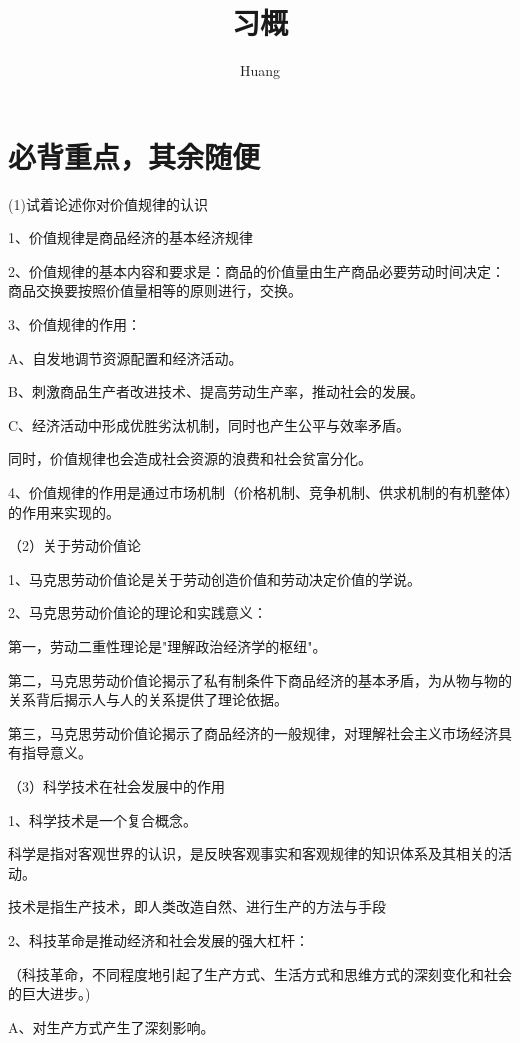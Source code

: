 \documentclass[lang=cn,10pt]{elegantbook}
\title{习概}
\author{ Huang}
\begin{document}
	
	\maketitle
	\frontmatter
	
	\tableofcontents
	
	\mainmatter
	\chapter{必背重点，其余随便}
	(1)试着论述你对价值规律的认识
	
	1、价值规律是商品经济的基本经济规律
	
	2、价值规律的基本内容和要求是：商品的价值量由生产商品必要劳动时间决定：商品交换要按照价值量相等的原则进行，交换。
	
	3、价值规律的作用：
	
	A、自发地调节资源配置和经济活动。
	
	B、刺激商品生产者改进技术、提高劳动生产率，推动社会的发展。
	
	C、经济活动中形成优胜劣汰机制，同时也产生公平与效率矛盾。
	
	同时，价值规律也会造成社会资源的浪费和社会贫富分化。
	
	4、价值规律的作用是通过市场机制（价格机制、竞争机制、供求机制的有机整体）的作用来实现的。
	
	（2）关于劳动价值论
	
	1、马克思劳动价值论是关于劳动创造价值和劳动决定价值的学说。
	
	2、马克思劳动价值论的理论和实践意义：
	
	第一，劳动二重性理论是"理解政治经济学的枢纽"。
	
	第二，马克思劳动价值论揭示了私有制条件下商品经济的基本矛盾，为从物与物的关系背后揭示人与人的关系提供了理论依据。
	
	第三，马克思劳动价值论揭示了商品经济的一般规律，对理解社会主义市场经济具有指导意义。
	
	（3）科学技术在社会发展中的作用
	
	1、科学技术是一个复合概念。
	
	科学是指对客观世界的认识，是反映客观事实和客观规律的知识体系及其相关的活动。
	
	技术是指生产技术，即人类改造自然、进行生产的方法与手段
	
	2、科技革命是推动经济和社会发展的强大杠杆：
	
	（科技革命，不同程度地引起了生产方式、生活方式和思维方式的深刻变化和社会的巨大进步。)
	
	A、对生产方式产生了深刻影响。
	
\end{document}
